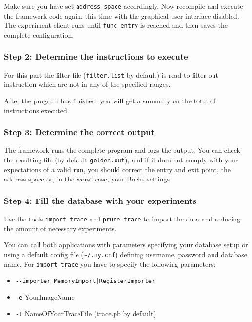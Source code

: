 \documentclass[a4paper,times,9pt]{article}
\begin{document}
Make sure you have set \verb+address_space+ accordingly.
Now recompile and execute the framework code again, this time with the graphical
user interface disabled. The experiment client runs until
\verb+func_entry+ is reached and then saves the complete configuration.

\subsubsection{Step 2: Determine the instructions to execute}


For this part the filter-file (\verb+filter.list+ by default) is
read to filter out instruction which are not in any of the specified
ranges.

After the program has finished, you will get a summary on the
total of instructions executed.

\subsubsection{Step 3: Determine the correct output}

The framework runs the complete program and logs the output. You can
check the resulting file (by default \texttt{golden.out}),
and if it does not comply with your expectations of a valid
run, you should correct the entry and exit point, the address space
or, in the worst case, your Bochs settings.

\subsubsection{Step 4: Fill the database with your experiments}

Use the tools \verb+import-trace+ and \verb+prune-trace+ to
import the data and reducing the amount of necessary experiments.

You can call both applications with parameters specifying your
database setup or using a default config file (\verb+~/.my.cnf+)
defining username, password and database name. For \verb+import-trace+
you have to specify the following parameters: 

\begin{itemize}
	\item \verb+--importer MemoryImport|RegisterImporter+
	\item \verb+-e+ YourImageName
	\item \verb+-t+ NameOfYourTraceFile (trace.pb by default)
\end{itemize}
\end{document}

